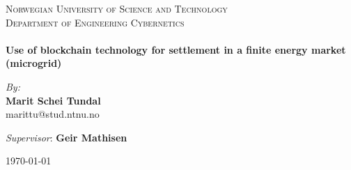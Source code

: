 
\begin{center}

\textsc{\LARGE Norwegian University of Science and Technology}\\[0.8cm] 
\textsc{\Large Department of Engineering Cybernetics}\\[0.6cm]

\HRule \\[0.4cm]
{ \huge \bfseries Use of blockchain technology for settlement in a finite energy market (microgrid)}
\HRule \\[1.5cm]

\begin{center} \large
\emph{By:}\\
\textbf{Marit Schei Tundal}\\
marittu@stud.ntnu.no
\end{center}

\begin{center}\large
\emph{Supervisor}: \textbf{Geir Mathisen}
\end{center}


\vfill

\begin{figure}[!h]
    \centering
\end{figure}

\vfill

{\large \monthyear\today}

\end{center}
\newpage